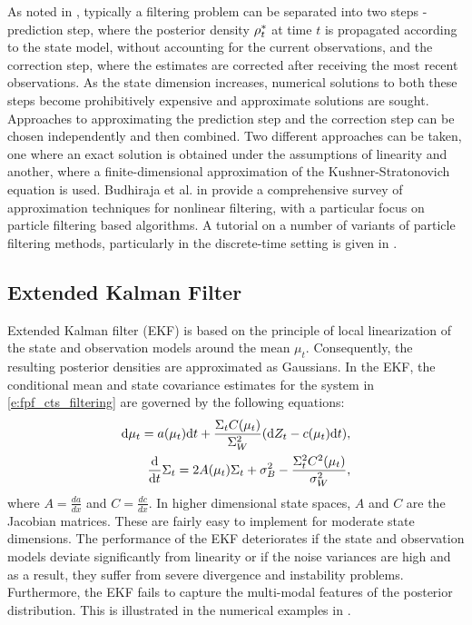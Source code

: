 As noted in , typically a filtering problem can be separated into two steps - prediction step, where the posterior density $\rho^*_t$ at time $t$ is propagated according to the state model, without accounting for the current observations, and the correction step, where the estimates are corrected after receiving the most recent observations. As the state dimension increases, numerical solutions to both these steps become prohibitively expensive and approximate solutions are sought. Approaches to approximating the prediction step and the correction step can be chosen independently and then combined. Two different approaches can be taken, one where an exact solution is obtained under the assumptions of linearity and another, where a finite-dimensional approximation of the Kushner-Stratonovich equation is used. Budhiraja et al. in \cite{budchelee07} provide a comprehensive survey of approximation techniques for nonlinear filtering, with a particular focus on particle filtering based algorithms. A tutorial on a number of variants of particle filtering methods, particularly in the discrete-time setting is given in \cite{arumasgorcla02}.
\subsection{Extended Kalman Filter}
\label{s:ekf}
Extended Kalman filter (EKF) \cite{jaz70} is based on the principle of local linearization of the state and observation models around the mean $\mu_t$. Consequently, the resulting posterior densities are approximated as Gaussians. In the EKF, the conditional mean and state covariance estimates for the system in \eqref{e:fpf_cts_filtering} are governed by the following equations: 
\begin{align}
\ud \mu_t = a(\mu_t) \ud t + \frac{\Sigma_t C(\mu_t)}{\Sigma^2_W} (\ud Z_t - c(\mu_t) \ud t), \\
\frac{\ud}{\ud t} \Sigma_t = 2 A(\mu_t) \Sigma_t  + \sigma^2_B - \frac{\Sigma^2_t C^2(\mu_t)}{\sigma^2_W}, 
\label{e:fpf_ekf}
\end{align}
where $A = \frac{d a}{dx}$ and $C = \frac{d c}{dx}$. In higher dimensional state spaces, $A$ and $C$ are the Jacobian matrices. These are fairly easy to implement for moderate state dimensions. The performance of the EKF deteriorates if the state and observation models deviate significantly from linearity or if the noise variances are high and as a result, they suffer from severe divergence and instability problems. Furthermore, the EKF fails to capture the multi-modal features of the posterior distribution. This is illustrated in the numerical examples in .


